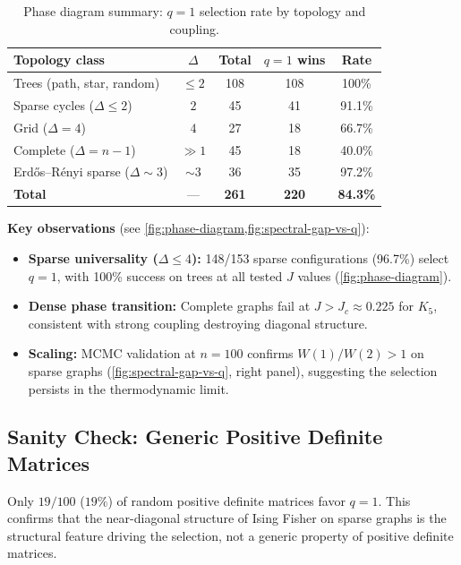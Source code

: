 \documentclass[11pt]{article}
\theoremstyle{definition}
\theoremstyle{remark}
\begin{document}
\begin{table}[htbp]
\centering
\caption{Phase diagram summary: $q=1$ selection rate by topology and coupling.}
\label{tab:phase-summary}
\begin{tabular}{@{}lcccc@{}}
\toprule
Topology class & $\Delta$ & Total & $q{=}1$ wins & Rate \\
\midrule
Trees (path, star, random) & $\leq 2$ & 108 & 108 & 100\% \\
Sparse cycles ($\Delta \leq 2$) & $2$ & 45 & 41 & 91.1\% \\
Grid ($\Delta = 4$) & $4$ & 27 & 18 & 66.7\% \\
Complete ($\Delta = n{-}1$) & $\gg 1$ & 45 & 18 & 40.0\% \\
Erdős--Rényi sparse ($\Delta \sim 3$) & $\sim 3$ & 36 & 35 & 97.2\% \\
\midrule
\textbf{Total} & --- & \textbf{261} & \textbf{220} & \textbf{84.3\%} \\
\bottomrule
\end{tabular}
\end{table}

\textbf{Key observations} (see \cref{fig:phase-diagram,fig:spectral-gap-vs-q}):
\begin{itemize}
\item \textbf{Sparse universality ($\Delta \leq 4$):} 148/153 sparse
  configurations (96.7\%) select $q=1$, with 100\% success on trees at all
  tested $J$ values (\cref{fig:phase-diagram}).
\item \textbf{Dense phase transition:} Complete graphs fail at $J > J_c \approx
  0.225$ for $K_5$, consistent with strong coupling destroying diagonal structure.
\item \textbf{Scaling:} MCMC validation at $n=100$ confirms $W(1)/W(2) > 1$ on
  sparse graphs (\cref{fig:spectral-gap-vs-q}, right panel), suggesting the
  selection persists in the thermodynamic limit.
\end{itemize}

\subsection{Sanity Check: Generic Positive Definite Matrices}

Only $19/100$ ($19\%$) of random positive definite matrices favor $q = 1$.
This confirms that the near-diagonal structure of Ising Fisher on sparse
graphs is the structural feature driving the selection, not a generic
property of positive definite matrices.
\end{document}
